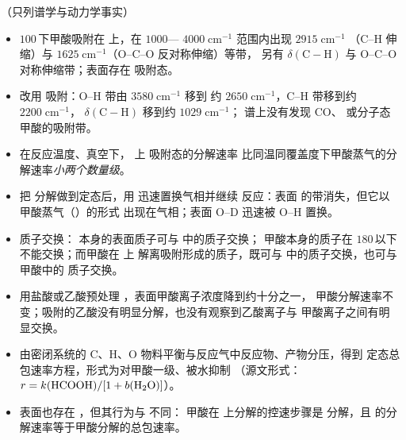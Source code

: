 \begin{obs}
（只列谱学与动力学事实）
\begin{itemize}
  \item[(a)] $100$\,\degC 下甲酸吸附在  上，在 $1000$—
        $4000\;\mathrm{cm^{-1}}$ 范围内出现 $2915\;\mathrm{cm^{-1}}$
        （C--H 伸缩）与 $1625\;\mathrm{cm^{-1}}$（O--C--O 反对称伸缩）等带，
        另有 $\delta(\mathrm{C{-}H})$ 与 O--C--O 对称伸缩带；表面存在
         吸附态。
  \item[(b)] 改用  吸附：O--H 带由 $3580\;\mathrm{cm^{-1}}$ 移到
        约 $2650\;\mathrm{cm^{-1}}$，C--H 带移到约 $2200\;\mathrm{cm^{-1}}$，
        $\delta(\mathrm{C{-}H})$ 移到约 $1029\;\mathrm{cm^{-1}}$；
        谱上没有发现 CO、 或分子态甲酸的吸附带。
  \item[(c)] 在反应温度、真空下， 上  吸附态的分解速率
        比同温同覆盖度下甲酸蒸气的分解速率\emph{小两个数量级}。
  \item[(d)] 把  分解做到定态后，用  迅速置换气相并继续
        反应：表面  的带消失，但它以甲酸蒸气（）的形式
        出现在气相；表面 O--D 迅速被 O--H 置换。
  \item[(e)] 质子交换： 本身的表面质子可与  中的质子交换；
        甲酸本身的质子在 $180$\,\degC 以下不能交换；而甲酸在  上
        解离吸附形成的质子，既可与  中的质子交换，也可与甲酸中的
        质子交换。
  \item[(f)] 用盐酸或乙酸预处理 ，表面甲酸离子浓度降到约十分之一，
        甲酸分解速率不变；吸附的乙酸没有明显分解，也没有观察到乙酸离子与
        甲酸离子之间有明显交换。
  \item[(g)] 由密闭系统的 C、H、O 物料平衡与反应气中反应物、产物分压，得到
        定态总包速率方程，形式为对甲酸一级、被水抑制
        （源文形式：$r=k(\ce{HCOOH})/[1+b(\ce{H2O})]$）。
  \item[(h)]  表面也存在 ，但其行为与  不同：
        甲酸在  上分解的控速步骤是  分解，且 
        的分解速率等于甲酸分解的总包速率。
\end{itemize}
\end{obs}

